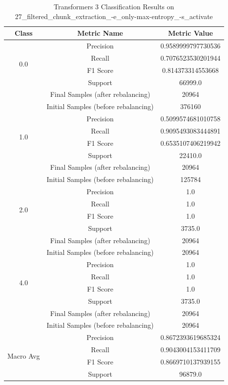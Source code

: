 \begin{longtable}{|c|c|c|}
\caption{Transformers 3 Classification Results on 27\_filtered\_chunk\_extraction\_-e\_only-max-entropy\_-s\_activate} \label{tab:27_filtered_chunk_extraction_-e_only-max-entropy_-s_activate_transformers_3_classifiers_results} \\
\hline
Class & Metric Name & Metric Value \\
\hline
\multirow{4}{*}{0.0} & Precision & 0.9589999797730536 \\
 & Recall & 0.7076523530201944 \\
 & F1 Score & 0.814373314553668 \\
 & Support & 66999.0 \\
 & Final Samples (after rebalancing) & 20964 \\
 & Initial Samples (before rebalancing) & 376160 \\
\hline
\multirow{4}{*}{1.0} & Precision & 0.5099574681010758 \\
 & Recall & 0.9095493083444891 \\
 & F1 Score & 0.6535107406219942 \\
 & Support & 22410.0 \\
 & Final Samples (after rebalancing) & 20964 \\
 & Initial Samples (before rebalancing) & 125784 \\
\hline
\multirow{4}{*}{2.0} & Precision & 1.0 \\
 & Recall & 1.0 \\
 & F1 Score & 1.0 \\
 & Support & 3735.0 \\
 & Final Samples (after rebalancing) & 20964 \\
 & Initial Samples (before rebalancing) & 20964 \\
\hline
\multirow{4}{*}{4.0} & Precision & 1.0 \\
 & Recall & 1.0 \\
 & F1 Score & 1.0 \\
 & Support & 3735.0 \\
 & Final Samples (after rebalancing) & 20964 \\
 & Initial Samples (before rebalancing) & 20964 \\
\hline
\multirow{4}{*}{Macro Avg} & Precision & 0.8672393619685324 \\
 & Recall & 0.9043004153411709 \\
 & F1 Score & 0.8669710137939155 \\
 & Support & 96879.0 \\

\end{longtable}
